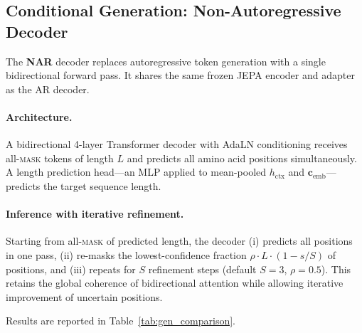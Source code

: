 \subsection{Conditional Generation: Non-Autoregressive Decoder}
\label{sec:methods_nar}

The \textbf{NAR} decoder replaces autoregressive token generation with
a single bidirectional forward pass.
It shares the same frozen JEPA encoder and adapter as the AR decoder.

\paragraph{Architecture.}
A bidirectional 4-layer Transformer decoder with AdaLN conditioning receives
all-\textsc{mask} tokens of length $L$ and predicts all amino acid positions
simultaneously.
A length prediction head---an MLP applied to mean-pooled $h_\text{ctx}$ and
$\mathbf{c}_\text{emb}$---predicts the target sequence length.

\paragraph{Inference with iterative refinement.}
Starting from all-\textsc{mask} of predicted length, the decoder
(i) predicts all positions in one pass, (ii) re-masks the lowest-confidence
fraction $\rho \cdot L \cdot (1 - s/S)$ of positions, and (iii) repeats for
$S$ refinement steps (default $S=3$, $\rho=0.5$).
This retains the global coherence of bidirectional attention while allowing
iterative improvement of uncertain positions.

Results are reported in Table~\ref{tab:gen_comparison}.
